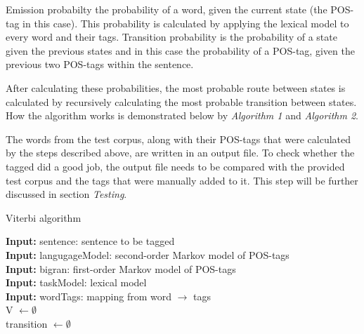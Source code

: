 \documentclass[10pt, a4paper]{article}
\begin{document}
Emission probabilty the probability of a word, given the current state (the POS-tag in this case). This probability is calculated by applying the lexical model to every word and their tags. Transition probability is the probability of a state given the previous states and in this case the probability of a POS-tag, given the previous two POS-tags within the sentence.

After calculating these probabilities, the most probable route between states is calculated by recursively calculating the most probable transition between states. How the algorithm works is demonstrated below by \textit{Algorithm 1} and \textit{Algorithm 2}.

The words from the test corpus, along with their POS-tags that were calculated by the steps described above, are written in an output file. To check whether the tagged did a good job, the output file needs to be compared with the provided test corpus and the tags that were manually added to it. This step will be further discussed in section \textit{Testing}.


\begin{algorithm}[H]
\caption{Viterbi algorithm}
\SetAlgoLined
\textbf{Input:} sentence: sentence to be tagged\\
\textbf{Input:} langugageModel: second-order Markov model of POS-tags\\
\textbf{Input:} bigran: first-order Markov model of POS-tags\\
\textbf{Input:} taskModel: lexical model\\
\textbf{Input:} wordTags: mapping from word $\rightarrow$ tags\\
V $\leftarrow \emptyset$\\
transition $\leftarrow \emptyset$\\
\end{algorithm}
\end{document}
